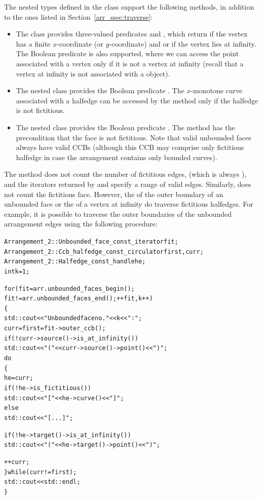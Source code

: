 \begin{ccAdvanced}
The nested types defined in the  class support the
following methods, in addition to the ones listed in
Section~\ref{arr_ssec:traverse}:
\begin{itemize}
\item
The  class provides three-valued predicates
 and , which
return  if the vertex has a finite $x$-coordinate (or
$y$-coordinate) and  or  if
the vertex lies at infinity. The Boolean predicate
 is also supported, where we can access the
point associated with a vertex only if it is not a vertex at infinity
(recall that a vertex at infinity is not associated with a
 object).
%
\item
The nested  class provides the Boolean predicate
. The $x$-monotone curve associated with
a halfedge can be accessed by the  method only if the
halfedge is not fictitious.
%
\item
The nested  class provides the Boolean predicate
. The method  has the
precondition that the face is not fictitious. Note that valid
unbounded faces always have valid CCBs (although this CCB may
comprise only fictitious halfedge in case the arrangement contains
only bounded curves).
\end{itemize}

The method  does not count the number of
fictitious edges, (which is always
), and the iterators
returned by  and  specify
a range of valid edges. Similarly,  does not
count the fictitious face.
However, the  of the outer boundary of an
unbounded face or the  of a vertex
at infinity do traverse fictitious halfedges. For example, it is possible
to traverse the outer boundaries of the unbounded arrangement edges
using the following procedure:
\begin{alltt}
  Arrangement_2::Unbounded_face_const_iterator  fit;
  Arrangement_2::Ccb_halfedge_const_circulator  first, curr;
  Arrangement_2::Halfedge_const_handle          he;
  int                                           k = 1;

  for (fit = arr.unbounded_faces_begin();
       fit != arr.unbounded_faces_end(); ++fit, k++)
  \{
    std::cout << "Unbounded face no. " << k << ": ";
    curr = first = fit->outer_ccb();
    if (! curr->source()->is_at_infinity())
      std::cout << "(" << curr->source()->point() << ")";
    do
    \{
      he = curr;
      if (! he->is_fictitious())
        std::cout << "   [" << he->curve() << "]   ";
      else
        std::cout << "   [ ... ]   ";

      if (! he->target()->is_at_infinity())
        std::cout << "(" << he->target()->point() << ")";

      ++curr;
    \} while (curr != first);
    std::cout << std::endl;
  \}
\end{alltt}

\end{ccAdvanced}
